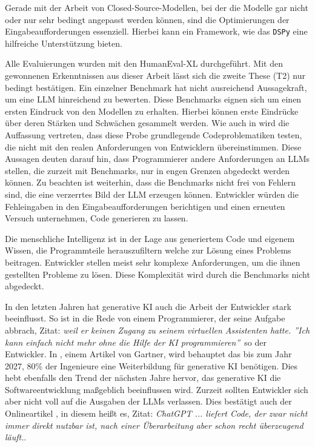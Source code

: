 Gerade mit der Arbeit von Closed-Source-Modellen, bei der die Modelle gar nicht oder nur sehr bedingt angepasst werden können, sind die Optimierungen der Eingabeaufforderungen essenziell. Hierbei kann ein Framework, wie das \texttt{DSPy} eine hilfreiche Unterstützung bieten.\vspace{0.2cm}

Alle Evaluierungen wurden mit den HumanEval-XL durchgeführt. Mit den gewonnenen Erkenntnissen aus dieser Arbeit lässt sich die zweite These (T2) nur bedingt bestätigen. Ein einzelner Benchmark hat nicht ausreichend Aussagekraft, um eine LLM hinreichend zu bewerten. Diese Benchmarks eignen sich um einen ersten Eindruck von den Modellen zu erhalten. Hierbei können erste Eindrücke über deren Stärken und Schwächen gesammelt werden. Wie auch in \cite{zhang-2024} wird die Auffassung vertreten, dass diese Probe grundlegende Codeproblematiken testen, die nicht mit den realen Anforderungen von Entwicklern übereinstimmen. Diese Aussagen deuten darauf hin, dass Programmierer andere Anforderungen an LLMs stellen, die zurzeit mit Benchmarks, nur in engen Grenzen abgedeckt werden können. Zu beachten ist weiterhin, dass die Benchmarks nicht frei von Fehlern sind, die eine verzerrtes Bild der LLM erzeugen können. Entwickler würden die Fehleingaben in den Eingabeaufforderungen berichtigen und einen erneuten Versuch unternehmen, Code generieren zu lassen.\vspace{0.2cm}

Die menschliche Intelligenz ist in der Lage aus generiertem Code und eigenem Wissen, die Programmteile herauszufiltern welche zur Lösung eines Problems beitragen. Entwickler stellen meist sehr komplexe Anforderungen, um die ihnen gestellten Probleme zu lösen. Diese Komplexität wird durch die Benchmarks nicht abgedeckt.\vspace{0.2cm}

In den letzten Jahren hat generative KI auch die Arbeit der Entwickler stark beeinflusst. So ist in \cite{focus-online-2025} die Rede von einem Programmierer, der seine Aufgabe abbrach, Zitat: \glqq \textit{weil er keinen Zugang zu seinem virtuellen Assistenten hatte. ''Ich kann einfach nicht mehr ohne die Hilfe der KI programmieren''}\grqq \ so der Entwickler. In \cite{company_gartner_2024}, einem Artikel von Gartner, wird behauptet das bis zum Jahr 2027, 80\% der Ingenieure eine Weiterbildung für generative KI benötigen. Dies hebt ebenfalls den Trend der nächsten Jahre hervor, das generative KI die Softwareentwicklung maßgeblich beeinflussen wird. Zurzeit sollten Entwickler sich aber nicht voll auf die Ausgaben der LLMs verlassen. Dies bestätigt auch der Onlineartikel \cite{albrecht-2023}, in diesem heißt es, Zitat: \glqq \textit{ChatGPT ... liefert Code, der zwar nicht immer direkt nutzbar ist, nach einer Überarbeitung aber schon recht überzeugend läuft.}\grqq.\vspace{0.2cm}

